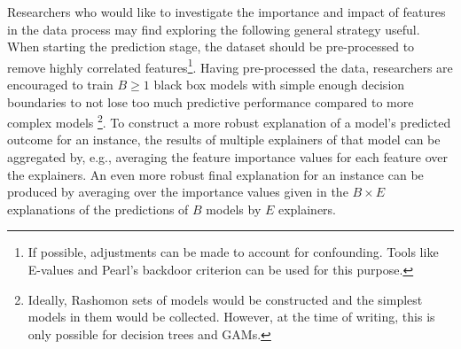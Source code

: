 \documentclass[12pt]{article}  %
\begin{document}
            Researchers who would like to investigate the importance and impact of features in the data  process may find exploring the following general strategy useful.
            When starting the prediction stage, the dataset should be pre-processed to remove highly correlated features\footnote{If possible, adjustments can be made to account for confounding. Tools like E-values\citep{gaster2023quantifying} and Pearl's backdoor criterion can be used for this purpose.}. %
            Having pre-processed the data, researchers are encouraged to train $B\geq 1$ black box models with simple enough decision boundaries to not lose too much predictive performance compared to more complex models \footnote{Ideally, Rashomon sets of models would be constructed and the simplest models in them would be collected. However, at the time of writing, this is only possible for decision trees and GAMs.}. To construct a more robust explanation of a model's predicted outcome for an instance, the results of multiple explainers of that model can be aggregated by, e.g., averaging the feature importance values for each feature over the explainers. An even more robust final explanation for an instance can be produced by averaging over the importance values given in the $B\times E$ explanations of the predictions of $B$ models by $E$ explainers.
          
\end{document}
